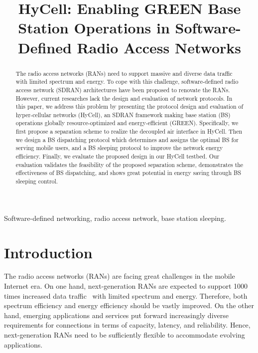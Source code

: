 \documentclass[conference]{IEEEtran}
\begin{document}
\title{HyCell: Enabling GREEN
Base Station Operations in Software-Defined
Radio Access Networks}
\author{
}
\maketitle

\begin{abstract}

  The radio access networks (RANs) need to support
  massive and diverse data traffic with limited spectrum and energy.
  To cope with this challenge, software-defined radio access network (SDRAN)
  architectures have been proposed to renovate the RANs. However, current
  researches lack the design and evaluation of network protocols. In this paper,
  we address this problem by presenting the protocol design and evaluation of
  hyper-cellular networks (HyCell), an SDRAN framework making base station (BS) operations globally
  resource-optimized and energy-efficient (GREEN).
  Specifically, we first propose a separation scheme to realize the
  decoupled air
  interface in HyCell. Then we design a BS dispatching protocol which determines and assigns
  the optimal BS for serving mobile users, and a BS sleeping protocol
  to improve the network energy efficiency. Finally, we evaluate
  the proposed design in our HyCell testbed. Our evaluation validates the feasibility of the
  proposed separation scheme, demonstrates the effectiveness of BS dispatching,
  and shows great potential in energy saving through BS sleeping control.
\end{abstract}

\begin{IEEEkeywords}
  Software-defined networking, radio access network, base station sleeping.
\end{IEEEkeywords}

\section{Introduction}
\label{sec:intro}

The radio access networks (RANs) are facing great
challenges in the mobile Internet era.
On one hand, next-generation RANs are expected to support 1000 times increased
data traffic~\cite{4gamericas2014meeting} with limited spectrum and energy.
Therefore, both spectrum efficiency and energy efficiency should be
vastly improved.
On the other hand, emerging applications and services put forward increasingly diverse
requirements for connections in terms of capacity, latency, and reliability.
Hence, next-generation RANs need to be sufficiently flexible to accommodate
evolving applications.
\end{document}
